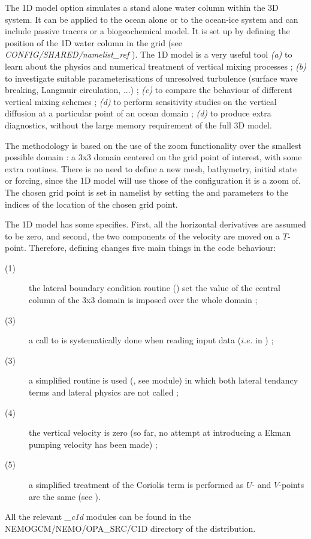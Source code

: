 \documentclass[../tex_main/NEMO_manual]{subfiles}
\begin{document}
The 1D model option simulates a stand alone water column within the 3D \NEMO system. 
It can be applied to the ocean alone or to the ocean-ice system and can include passive tracers 
or a biogeochemical model. It is set up by defining the position of the 1D water column in the grid 
(see \textit{CONFIG/SHARED/namelist\_ref} ). 
The 1D model is a very useful tool  
\textit{(a)} to learn about the physics and numerical treatment of vertical mixing processes ; 
\textit{(b)} to investigate suitable parameterisations of unresolved turbulence (surface wave
breaking, Langmuir circulation, ...) ; 
\textit{(c)} to compare the behaviour of different vertical mixing schemes  ; 
\textit{(d)} to perform sensitivity studies on the vertical diffusion at a particular point of an ocean domain ; 
\textit{(d)} to produce extra diagnostics, without the large memory requirement of the full 3D model.

The methodology is based on the use of the zoom functionality over the smallest possible 
domain : a 3x3 domain centered on the grid point of interest, 
with some extra routines. There is no need to define a new mesh, bathymetry, 
initial state or forcing, since the 1D model will use those of the configuration it is a zoom of. 
The chosen grid point is set in \textit{} namelist by setting the  and  
parameters to the indices of the location of the chosen grid point.

The 1D model has some specifies. First, all the horizontal derivatives are assumed to be zero, and
second, the two components of the velocity are moved on a $T$-point. 
Therefore, defining  changes five main things in the code behaviour: 
\begin{description}
\item[(1)] the lateral boundary condition routine () set the value of the central column 
of the 3x3 domain is imposed over the whole domain ; 
\item[(3)] a call to  is systematically done when reading input data ($i.e.$ in ) ; 
\item[(3)] a simplified  routine is used (, see  module) in which 
both lateral tendancy terms and lateral physics are not called ; 
\item[(4)] the vertical velocity is zero (so far, no attempt at introducing a Ekman pumping velocity 
has been made) ; 
\item[(5)] a simplified treatment of the Coriolis term is performed as $U$- and $V$-points are the same 
(see ).
\end{description}
All the relevant \textit{\_c1d} modules can be found in the NEMOGCM/NEMO/OPA\_SRC/C1D directory of 
the \NEMO distribution.
\end{document}
